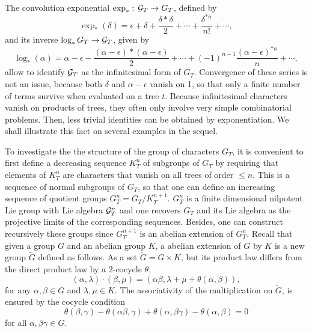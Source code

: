 \documentclass[12pt,here,feynmf]{article}
\begin{document}
The convolution exponential $\exp_{\ast}:\,{\cal G}_{T}\rightarrow G_{T}$, defined by
\begin{equation}
\exp_{\ast}(\delta)=\epsilon+\delta+\frac{\delta\ast\delta}{2}+\cdots+
\frac{\delta^{\ast n}}{n!}+\cdots,
\end{equation}
and its inverse $\log_{\ast}{G}_{T}\rightarrow {\cal G}_{T}$, given by
\begin{equation}
\log_{\ast}(\alpha)=
\alpha\!-\!\epsilon-\frac{(\alpha\!-\!\epsilon)\ast(\alpha\!-\!\epsilon)}{2}+\cdots+
(-1)^{n-1}\frac{(\alpha\!-\!\epsilon)^{\ast n}}{n}+\cdots,
\end{equation}
allow to identify ${\cal G}_{T}$ as the infinitesimal form of $G_{T}$. Convergence of these series is not an issue, because both $\delta$ and $\alpha-\epsilon$ vanish on 1, 
so that only a finite number of terms survive when evaluated on a tree $t$. Because infinitesimal characters vanish on products of trees,  they often only involve very simple combinatorial problems.  Then, less trivial identities can be obtained by exponentiation. We shall illustrate this fact on several examples in the sequel. 


To investigate the the structure of the group of characters $G_{T}$, it is convenient to first define a decreasing sequence $K_{T}^{n}$ of subgroups of $G_{T}$ by requiring that elements of $K_{T}^{n}$ are characters that vanish on all trees of order $\leq n$. This is a sequence of normal subgroups of $G_{T}$, so that one can define an increasing sequence of quotient groups $G^{n}_{T}=G_{T}/K_{T}^{n+1}$.  $G_{T}^{n}$ is a finite dimensional nilpotent Lie group with Lie algebra ${\cal G}_{T}^{n}$ and one recovers $G_{T}$ and its Lie algebra as the projective limits of the corresponding sequences.  Besides, one can construct recursively these groups since $G_{T}^{n+1}$ is an abelian extension of $G_{T}^{n}$. Recall that given a group $G$ and an abelian group $K$, a abelian extension of $G$ by $K$ is a new group $\tilde{G}$ defined as follows. As a set $\tilde{G}=G\times K$, but its product law differs from the direct product law by a 2-cocycle $\theta$,
\begin{equation}
\left(\alpha,\lambda\right)\cdot\left(\beta,\mu\right)=
\left(\alpha\beta,\lambda+\mu+\theta(\alpha,\beta)\right),
\end{equation}
for any $\alpha,\beta\in G$ and $\lambda,\mu\in K$. The associativity of the multiplication on $\tilde{G}$, is ensured by the cocycle condition
\begin{equation}
\theta(\beta,\gamma)-\theta(\alpha\beta,\gamma)+\theta(\alpha,\beta\gamma)-\theta(\alpha,\beta)=0
\end{equation}
for all $\alpha,\beta\gamma\in G$.
\end{document}
